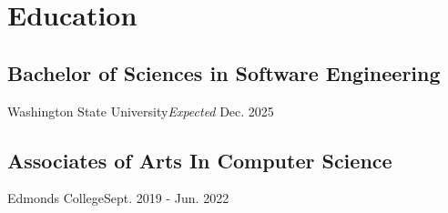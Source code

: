 \section{Education}
\subsection{Bachelor of Sciences in Software Engineering}{Washington State University}{\textit{Expected } Dec. 2025} \\
\subsection{Associates of Arts In Computer Science}{Edmonds College}{Sept. 2019 - Jun. 2022} \
